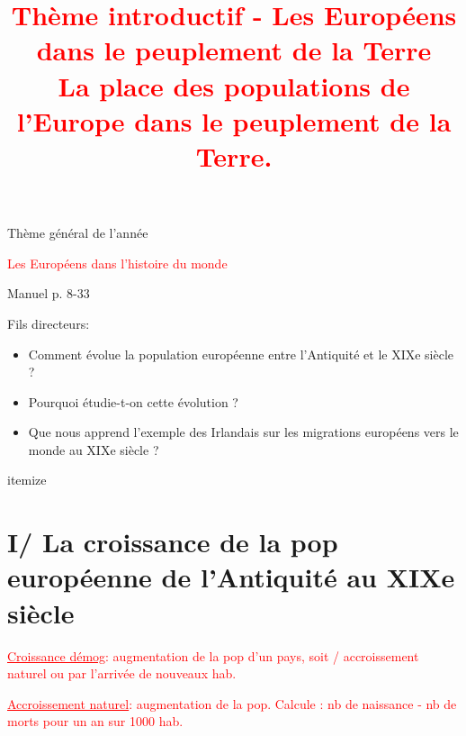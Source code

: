 \documentclass{beamer}
\date{}
\title{{\textcolor{red}{Thème introductif - Les Européens dans le peuplement de la Terre \\ La place des populations de l'Europe dans le peuplement de la Terre.}}}
\begin{document}
\newcommand{\df}[2]{\textcolor{red}{\underline{#1}: #2}}

\newcommand{\doc}[1]{
\begin{flushright}
\fbox{Documents : #1}
\end{flushright}
}

\newcommand{\con}[1]{\textcolor{blue}{\underline{Consigne}: #1}}

\newcommand{\rep}[1]{\textcolor{green}{\underline{Réponse}: #1}}

\begin{frame}{Thème général de l'année}
\begin{center}
{\Huge \textcolor{red}{Les Européens dans l'histoire du monde}}
\end{center}
\end{frame}




\begin{frame}
 \titlepage %
 \end{frame}

\begin{frame}{Manuel p. 8-33}

\end{frame}


\begin{frame}{Fils directeurs: }
\begin{itemize}
\item Comment évolue la population européenne entre l'Antiquité et le XIXe siècle ?
\item Pourquoi étudie-t-on cette évolution ?
\item Que nous apprend l'exemple des Irlandais sur les migrations européens vers le monde au XIXe siècle ?
\end{itemize}
\end{frame}
itemize
\section{I/ La croissance de la pop européenne de l'Antiquité au XIXe siècle}


\begin{frame}
\df{Croissance démog}{augmentation de la pop d'un pays, soit / accroissement naturel ou par l'arrivée de nouveaux hab.}

\vfill

\df{Accroissement naturel}{augmentation de la pop. Calcule : nb de naissance - nb de morts pour un an sur 1000 hab.}
\end{frame}
\end{document}
